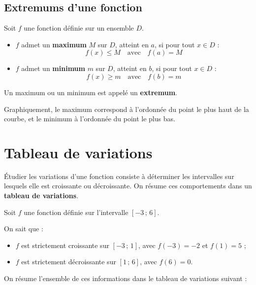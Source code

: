 \subsection{Extremums d'une fonction}

\begin{defin}
	Soit $f$ une fonction définie sur un ensemble $D$.
	\begin{itemize}
		\item $f$ admet un \textbf{maximum} $M$ sur $D$, atteint en $a$, si pour tout $x \in D$ :
		      \[
			      f(x) \le M \quad \text{avec} \quad f(a) = M
		      \]
		\item $f$ admet un \textbf{minimum} $m$ sur $D$, atteint en $b$, si pour tout $x \in D$ :
		      \[
			      f(x) \ge m \quad \text{avec} \quad f(b) = m
		      \]
	\end{itemize}
	Un maximum ou un minimum est appelé un \textbf{extremum}.
\end{defin}

\begin{rem}
	Graphiquement, le maximum correspond à l'ordonnée du point le plus haut de la courbe, et le minimum à l'ordonnée du point le plus bas.
\end{rem}

\section{Tableau de variations}

\begin{defin}
	Étudier les variations d'une fonction consiste à déterminer les intervalles sur lesquels elle est croissante ou décroissante. On résume ces comportements dans un \textbf{tableau de variations}.
\end{defin}

\begin{ex}
	Soit $f$ une fonction définie sur l'intervalle $[-3 \,;\, 6]$.
	
	On sait que :
	\begin{itemize}
		\item $f$ est strictement croissante sur $[-3 \,;\, 1]$, avec $f(-3) = -2$ et $f(1) = 5$ ;
		\item $f$ est strictement décroissante sur $[1 \,;\, 6]$, avec $f(6) = 0$.
	\end{itemize}

	On résume l'ensemble de ces informations dans le tableau de variations suivant :

	\begin{center}
	\end{center}
\end{ex}

